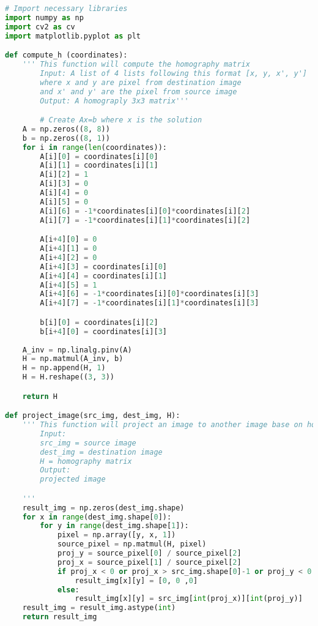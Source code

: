 \documentclass[11pt]{article}
\begin{document}
\begin{lstlisting}[language=Python, showstringspaces=false]
# Import necessary libraries
import numpy as np
import cv2 as cv
import matplotlib.pyplot as plt  

def compute_h (coordinates):
    ''' This function will compute the homography matrix
        Input: A list of 4 lists following this format [x, y, x', y']
        where x and y are pixel from destination image
        and x' and y' are the pixel from source image
        Output: A homograply 3x3 matrix'''

        # Create Ax=b where x is the solution
    A = np.zeros((8, 8))
    b = np.zeros((8, 1))
    for i in range(len(coordinates)):
        A[i][0] = coordinates[i][0]
        A[i][1] = coordinates[i][1]
        A[i][2] = 1
        A[i][3] = 0
        A[i][4] = 0
        A[i][5] = 0
        A[i][6] = -1*coordinates[i][0]*coordinates[i][2]
        A[i][7] = -1*coordinates[i][1]*coordinates[i][2]

        A[i+4][0] = 0
        A[i+4][1] = 0
        A[i+4][2] = 0
        A[i+4][3] = coordinates[i][0]
        A[i+4][4] = coordinates[i][1]
        A[i+4][5] = 1
        A[i+4][6] = -1*coordinates[i][0]*coordinates[i][3]
        A[i+4][7] = -1*coordinates[i][1]*coordinates[i][3]

        b[i][0] = coordinates[i][2]
        b[i+4][0] = coordinates[i][3]
    
    A_inv = np.linalg.pinv(A)
    H = np.matmul(A_inv, b)
    H = np.append(H, 1)
    H = H.reshape((3, 3))

    return H

def project_image(src_img, dest_img, H):
    ''' This function will project an image to another image base on homography
        Input: 
        src_img = source image
        dest_img = destination image
        H = homography matrix
        Output: 
        projected image

    '''
    result_img = np.zeros(dest_img.shape)
    for x in range(dest_img.shape[0]):
        for y in range(dest_img.shape[1]):
            pixel = np.array([y, x, 1])
            source_pixel = np.matmul(H, pixel)
            proj_y = source_pixel[0] / source_pixel[2]
            proj_x = source_pixel[1] / source_pixel[2]
            if proj_x < 0 or proj_x > src_img.shape[0]-1 or proj_y < 0 or proj_y > src_img.shape[1]-1:
                result_img[x][y] = [0, 0 ,0]
            else:
                result_img[x][y] = src_img[int(proj_x)][int(proj_y)]
    result_img = result_img.astype(int)
    return result_img


\end{lstlisting}
\end{document}
